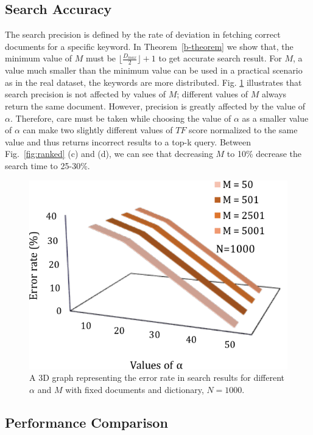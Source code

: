 \documentclass[sigconf,pdftex]{acmart}
\begin{document}
\subsection{Search Accuracy}

The search precision is defined by the rate of deviation in fetching correct documents for a specific keyword. In Theorem~\ref{b-theorem} we show that, the minimum value of $M$ must be $\lfloor\frac{D_{max}}{2}\rfloor+1$ to get accurate search result. For $M$, a value much smaller than the minimum value can be used in a practical scenario as in the real dataset, the keywords are more distributed. Fig. \ref{error} illustrates that search precision is not affected by values of $M$; different values of $M$ always return the same document. However, precision is greatly affected by the value of $\alpha$. Therefore, care must be taken while choosing the value of $\alpha$ as a smaller value of $\alpha$ can make two slightly different values of $TF$ score normalized to the same value and thus returns incorrect results to a top-k query. Between Fig.~\ref{fig:ranked} (c) and (d), we can see that decreasing $M$ to 10\% decrease the search time to 25-30\%.

\begin{figure}
    \centering
       \includegraphics[width=0.6\linewidth]{pdfs/searchAccuracy.pdf}
  \caption{\small{A 3D graph representing the error rate in search results for different $\alpha$ and $M$ with fixed documents and dictionary, $N=1000$.}}
  \label{error} 
\end{figure}

\subsection{Performance Comparison}
\end{document}

